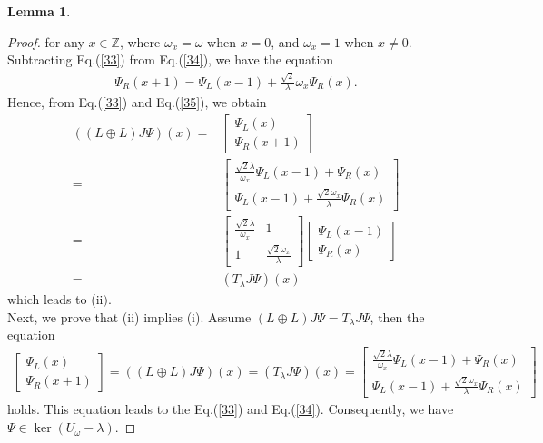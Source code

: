 \documentclass[a4paper,12pt]{article}
\theoremstyle{plain}
\theoremstyle{definition}
\newtheorem{lemma}[thm]{Lemma}
\theoremstyle{definition}
\begin{document}
\begin{lemma}
\begin{proof}
for any $x\in \mathbb{Z}$, where $\omega_x=\omega $ when $x=0$, and $\omega_x=1$ when $x\neq0$. Subtracting Eq.(\ref{33}) from Eq.(\ref{34}), we have the equation 
\begin{eqnarray}
\label{35}
\Psi_{R}(x+1)= \Psi_{L}(x-1)+\frac{\sqrt{2}}{\lambda}\omega_{x}\Psi_{R}(x).
\end{eqnarray}
Hence, from Eq.(\ref{33}) and Eq.(\ref{35}), we obtain
\begin{align*}
((L \oplus L)J\Psi)(x) =&
\begin{bmatrix}
    \Psi_{L}(x) \\
    \Psi_{R}(x+1)
\end{bmatrix}\\
=&
\begin{bmatrix}
\frac{\sqrt{2}\lambda}{\omega_{x}}\Psi_{L}(x-1)+\Psi_{R}(x) \\
\Psi_{L}(x-1)+\frac{\sqrt{2}\omega_{x}}{\lambda}\Psi_{R}(x)
\end{bmatrix}\nonumber\\
=&\begin{bmatrix}
\frac{\sqrt{2}\lambda}{\omega_{x}} & 1 \\
1 & \frac{\sqrt{2}\omega_{x}}{\lambda}
\end{bmatrix}
\begin{bmatrix}
\Psi_{L}(x-1) \\
\Psi_{R}(x)
\end{bmatrix}\nonumber\\
=& (T_{\lambda}J\Psi)(x) \nonumber
\end{align*}
which leads to ($\mathrm{ii})$.\\

Next, we prove that (ii) implies (i). Assume $(L\oplus L)J\Psi = T_\lambda J\Psi$, then the equation
\begin{align*}
\begin{bmatrix}
    \Psi_{L}(x) \\
    \Psi_{R}(x+1)
\end{bmatrix}
=
((L \oplus L)J\Psi)(x) 
=
 (T_{\lambda}J\Psi)(x)
 =
\begin{bmatrix}
\frac{\sqrt{2}\lambda}{\omega_{x}}\Psi_{L}(x-1)+\Psi_{R}(x) \\
\Psi_{L}(x-1)+\frac{\sqrt{2}\omega_{x}}{\lambda}\Psi_{R}(x)
\end{bmatrix}
\end{align*}
holds. This equation leads to the Eq.(\ref{33}) and Eq.(\ref{34}).
Consequently, we have $\Psi \in \ker(U_{\omega} - \lambda)$.
\end{proof}
\end{lemma}
\end{document}
